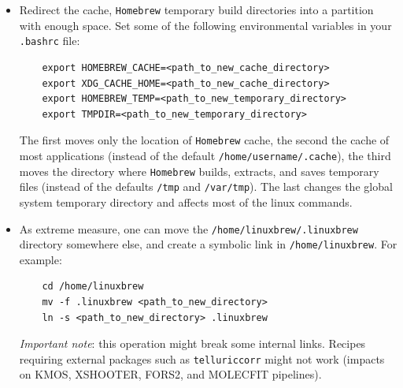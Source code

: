 \begin{itemize}
\begin{itemize}
   \item Redirect the cache, {\tt Homebrew} temporary build directories into a partition with enough space. Set some of the following environmental variables in your {\tt .bashrc} file:
\begin{verbatim}
    export HOMEBREW_CACHE=<path_to_new_cache_directory>
    export XDG_CACHE_HOME=<path_to_new_cache_directory>
    export HOMEBREW_TEMP=<path_to_new_temporary_directory>
    export TMPDIR=<path_to_new_temporary_directory>
\end{verbatim}
   The first moves only the location of {\tt Homebrew} cache, the second the cache of most applications (instead of the default {\tt /home/username/.cache}), the third moves the directory where {\tt Homebrew} builds, extracts, and saves temporary files (instead of the defaults {\tt /tmp} and {\tt /var/tmp}).
The last changes the global system temporary directory and affects most of the linux commands.

   \item  As extreme measure, one can move the {\tt /home/linuxbrew/.linuxbrew} directory somewhere else, and create a symbolic link in {\tt /home/linuxbrew}. For example:
\begin{verbatim}
    cd /home/linuxbrew
    mv -f .linuxbrew <path_to_new_directory>
    ln -s <path_to_new_directory> .linuxbrew
\end{verbatim}
   {\it Important note}: this operation might break some internal links. Recipes requiring external packages such as {\tt telluriccorr} might not work (impacts on KMOS, XSHOOTER, FORS2, and MOLECFIT pipelines). 

\end{itemize}
\end{itemize}
